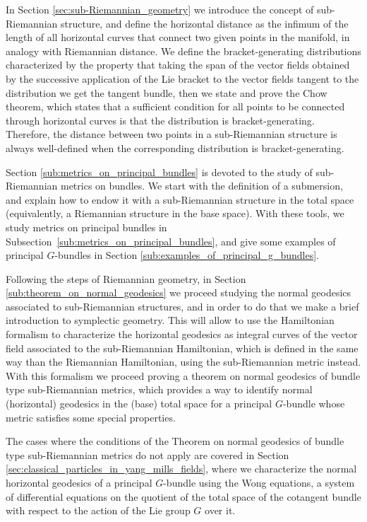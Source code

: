 \documentclass[12pt, letterpaper, reqno]{amsart}
\theoremstyle{definition}
\theoremstyle{plain}
\theoremstyle{remark}
\begin{document}
In Section \ref{sec:sub-Riemannian_geometry} we introduce the concept of sub-Riemannian structure, and define the horizontal distance as the infimum of the length of all horizontal curves that connect two given points in the manifold, in analogy with Riemannian distance. We define the bracket-generating distributions characterized by the property that taking the span of the vector fields obtained by the successive application of the Lie bracket to the vector fields tangent to the distribution we get the tangent bundle, then we state and prove the Chow theorem, which states that a sufficient condition for all points to be connected through horizontal curves is that the distribution is bracket-generating. Therefore, the distance between two points in a sub-Riemannian structure is always well-defined when the corresponding distribution is bracket-generating. 

Section \ref{sub:metrics_on_principal_bundles} is devoted to the study of sub-Riemannian metrics on bundles.
We start with the definition of a submersion, and explain how to endow it with a sub-Riemannian structure in the total space (equivalently, a Riemannian structure in the base space). With these tools, we study metrics on principal bundles in Subsection~\ref{sub:metrics_on_principal_bundles}, and give some examples of principal $ G $-bundles in Section \ref{sub:examples_of_principal_g_bundles}. 

Following the steps of Riemannian geometry, in Section \ref{sub:theorem_on_normal_geodesics} we proceed studying the normal geodesics associated to sub-Riemannian structures, and in order to do that we make a brief introduction to symplectic geometry. This will allow to use the Hamiltonian formalism to characterize the horizontal geodesics as integral curves of the vector field associated to the sub-Riemannian Hamiltonian, which is defined in the same way than the Riemannian Hamiltonian, using the sub-Riemannian metric instead. With this formalism we proceed proving a theorem on normal geodesics of bundle type sub-Riemannian metrics, which provides a way to identify normal (horizontal) geodesics in the (base) total space for a principal $ G $-bundle whose metric satisfies some special properties.

The cases where the conditions of the Theorem on normal geodesics of bundle type sub-Riemannian metrics do not apply are covered in Section \ref{sec:classical_particles_in_yang_mills_fields}, where we characterize the normal horizontal geodesics of a principal $ G $-bundle using the Wong equations, a system of differential equations on the quotient of the total space of the cotangent bundle with respect to the action of the Lie group $ G $ over it.
\end{document}
